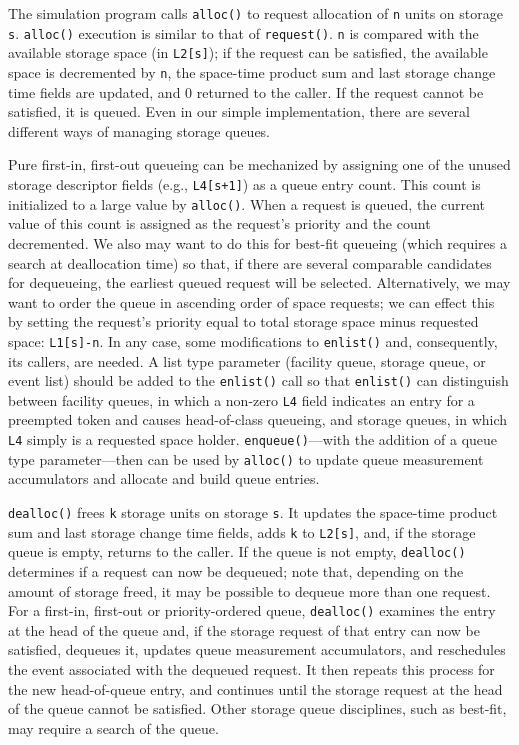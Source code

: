 The simulation program calls \texttt{alloc()} to request allocation of \texttt{n} units on
storage \texttt{s}. \texttt{alloc()} execution is similar to that of \texttt{request()}. \texttt{n} is compared
with the available storage space (in \texttt{L2[s]}); if the request can be
satisfied, the available space is decremented by \texttt{n}, the space-time product
sum and last storage change time fields are updated, and 0 returned to the
caller. If the request cannot be satisfied, it is queued. Even in our simple
implementation, there are several different ways of managing storage
queues.

Pure first-in, first-out queueing can be mechanized by assigning one of the
unused storage descriptor fields (e.g., \texttt{L4[s+1]}) as a queue entry count. This
\noindent count is initialized to a large value by \texttt{alloc()}. When a request is queued,
the current value of this count is assigned as the request's priority and the
count decremented. We also may want to do this for best-fit queueing (which
requires a search at deallocation time) so that, if there are several comparable
candidates for dequeueing, the earliest queued request will be selected.
Alternatively, we may want to order the queue in ascending order of space
requests; we can effect this by setting the request's priority equal to total
storage space minus requested space: \texttt{L1[s]-n}. In any case, some modifications
to \texttt{enlist()} and, consequently, its callers, are needed. A list type
parameter (facility queue, storage queue, or event list) should be added to
the \texttt{enlist()} call so that \texttt{enlist()} can distinguish between facility
queues, in which a non-zero \texttt{L4} field indicates an entry for a preempted token
and causes head-of-class queueing, and storage queues, in which \texttt{L4} simply is
a requested space holder. \texttt{enqueue()}---with the addition of a queue type
parameter---then can be used by \texttt{alloc()} to update queue measurement
accumulators and allocate and build queue entries.

\texttt{dealloc()} frees \texttt{k} storage units on storage \texttt{s}. It updates the space-time
product sum and last storage change time fields, adds \texttt{k} to \texttt{L2[s]}, and, if the
storage queue is empty, returns to the caller. If the queue is not empty,
\texttt{dealloc()} determines if a request can now be dequeued; note that, depending
on the amount of storage freed, it may be possible to dequeue more than
one request. For a first-in, first-out or priority-ordered queue, \texttt{dealloc()}
examines the entry at the head of the queue and, if the storage request of
that entry can now be satisfied, dequeues it, updates queue measurement
accumulators, and reschedules the event associated with the dequeued
request. It then repeats this process for the new head-of-queue entry, and
continues until the storage request at the head of the queue cannot be
satisfied. Other storage queue disciplines, such as best-fit, may require a
search of the queue.

